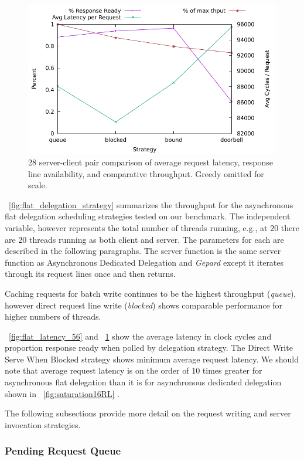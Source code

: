 \documentclass{uicthesi}
\begin{document}
\begin{figure}[ht!]
\centering
\includegraphics[width=0.9\columnwidth]{FIG/flat_latency_28.pdf}
\caption{28 server-client pair comparison of average request latency, response line availability, and comparative throughput. Greedy omitted for scale.}
\label{fig:flat_latency_28}
\end{figure}

~\ref{fig:flat_delegation_strategy} summarizes the throughput for the asynchronous flat delegation scheduling strategies tested on our benchmark. The independent variable, however represents the total number of threads running, e.g., at 20 there are 20 threads running as both client and server. The parameters for each are described in the following paragraphs. The server function is the same server function as Asynchronous Dedicated Delegation and \textit{Gepard} except it iterates through its request lines once and then returns. 

Caching requests for batch write continues to be the highest throughput (\textit{queue}), however direct request line write (\textit{blocked}) shows comparable performance for higher numbers of threads. 

~\ref{fig:flat_latency_56} and ~\ref{fig:flat_latency_28} show the average latency in clock cycles and proportion response ready when polled by delegation strategy. The Direct Write Serve When Blocked strategy shows minimum average request latency. We should note that average request latency is on the order of 10 times greater for asynchronous flat delegation than it is for asynchronous dedicated delegation shown in ~\ref{fig:saturation16RL} . 

The following subsections provide more detail on the request writing and server invocation strategies. 

\subsubsection{Pending Request Queue}
\end{document}
